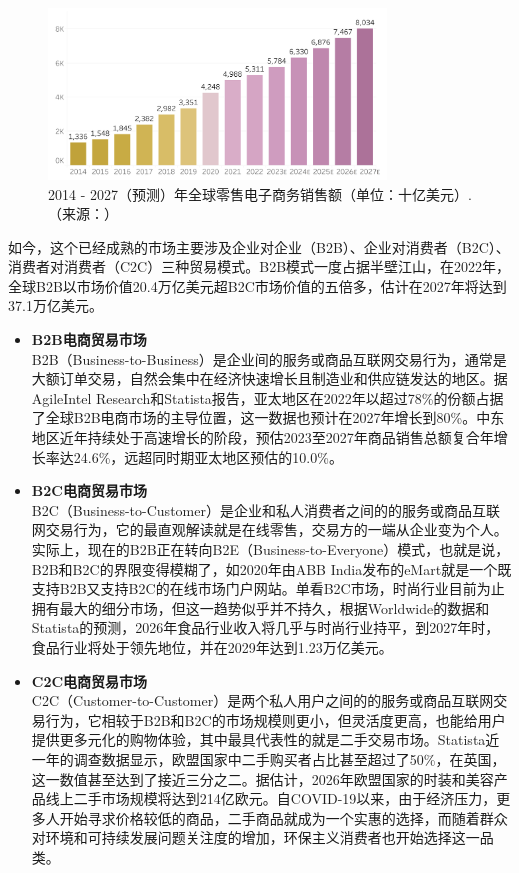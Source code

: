 \documentclass[12pt]{ctexart}
\begin{document}
\begin{figure}[htbp!]
    \centering
    \includegraphics[width=0.8\textwidth]{Images/2.png}
    \caption{2014 - 2027（预测）年全球零售电子商务销售额（单位：十亿美元）.（来源：\cite{2}）}
    \label{flow}
\end{figure}

如今，这个已经成熟的市场主要涉及企业对企业（B2B）、企业对消费者（B2C）、消费者对消费者（C2C）三种贸易模式。B2B模式一度占据半壁江山，在2022年，全球B2B以市场价值20.4万亿美元超B2C市场价值的五倍多，估计在2027年将达到37.1万亿美元\cite{1}。

\begin{itemize}
    \item \textbf{B2B电商贸易市场} \\
    B2B（Business-to-Business）是企业间的服务或商品互联网交易行为，通常是大额订单交易，自然会集中在经济快速增长且制造业和供应链发达的地区。据AgileIntel Research和Statista报告\cite{1}，亚太地区在2022年以超过78\%的份额占据了全球B2B电商市场的主导位置，这一数据也预计在2027年增长到80\%。中东地区近年持续处于高速增长的阶段，预估2023至2027年商品销售总额复合年增长率达24.6\%，远超同时期亚太地区预估的10.0\%。
    \item \textbf{B2C电商贸易市场} \\
    B2C（Business-to-Customer）是企业和私人消费者之间的的服务或商品互联网交易行为，它的最直观解读就是在线零售，交易方的一端从企业变为个人。实际上，现在的B2B正在转向B2E（Business-to-Everyone）模式，也就是说，B2B和B2C的界限变得模糊了，如2020年由ABB India发布的eMart就是一个既支持B2B又支持B2C的在线市场门户网站\cite{1}。单看B2C市场，时尚行业目前为止拥有最大的细分市场\cite{3}，但这一趋势似乎并不持久，根据Worldwide的数据和Statista的预测\cite{4}，2026年食品行业收入将几乎与时尚行业持平，到2027年时，食品行业将处于领先地位，并在2029年达到1.23万亿美元。
    \item \textbf{C2C电商贸易市场} \\
    C2C（Customer-to-Customer）是两个私人用户之间的的服务或商品互联网交易行为，它相较于B2B和B2C的市场规模则更小，但灵活度更高，也能给用户提供更多元化的购物体验，其中最具代表性的就是二手交易市场。Statista近一年的调查数据\cite{5}显示，欧盟国家中二手购买者占比甚至超过了50\%，在英国，这一数值甚至达到了接近三分之二。据估计，2026年欧盟国家的时装和美容产品线上二手市场规模将达到214亿欧元。自COVID-19以来，由于经济压力，更多人开始寻求价格较低的商品，二手商品就成为一个实惠的选择，而随着群众对环境和可持续发展问题关注度的增加，环保主义消费者也开始选择这一品类。
\end{itemize}
\end{document}
